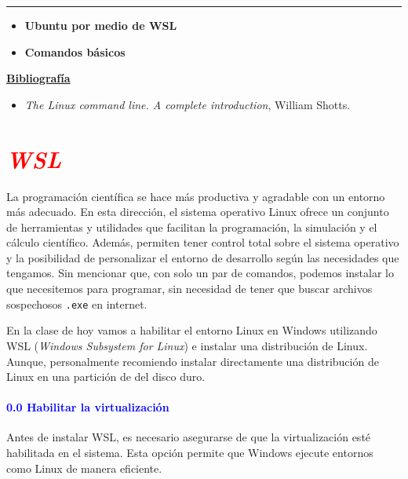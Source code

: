 \documentclass[12pt]{article}
\begin{document}
\thispagestyle{firstpage}
\vspace*{1.5cm}

\begin{center}
    \rule{\textwidth}{0.4pt}
\end{center}

\begin{itemize}[leftmargin=*,label=\textcolor{red}{\ensuremath{\blacktriangleright}}]
    \item \textbf{ Ubuntu por medio de WSL}
    \item \textbf{ Comandos básicos}
\end{itemize}

\noindent
\textbf{\underline{Bibliografía}}
\begin{itemize}[leftmargin=*, label={\textcolor{blue}{$\bullet$}}]
    \item \textit{The Linux command line. A complete introduction}, William Shotts.
\end{itemize}

\section*{\textcolor{red}{\textit{WSL}}}

La programación científica se hace más productiva y agradable con un entorno más adecuado. 
En esta dirección, el sistema operativo Linux ofrece un conjunto de herramientas y utilidades que facilitan 
la programación, la simulación y el cálculo científico. Además, permiten tener control total sobre el 
sistema operativo y la posibilidad de personalizar el entorno de desarrollo según las necesidades que tengamos. 
Sin mencionar que, con solo un par de comandos, podemos instalar lo que necesitemos para programar, 
sin necesidad de tener que buscar archivos sospechosos \lstinline|.exe| en internet. 

\noindent En la clase de hoy vamos a habilitar el entorno Linux en Windows utilizando
WSL (\textit{Windows Subsystem for Linux}) e instalar una distribución de Linux. 
Aunque, personalmente recomiendo instalar directamente una distribución de Linux en una partición de
del disco duro.

\paragraph{\textcolor{blue}{0.0 Habilitar la virtualización}}
Antes de instalar WSL, es necesario asegurarse de que la virtualización 
esté habilitada en el sistema. 
Esta opción permite que Windows ejecute entornos como Linux de manera eficiente.
\end{document}
